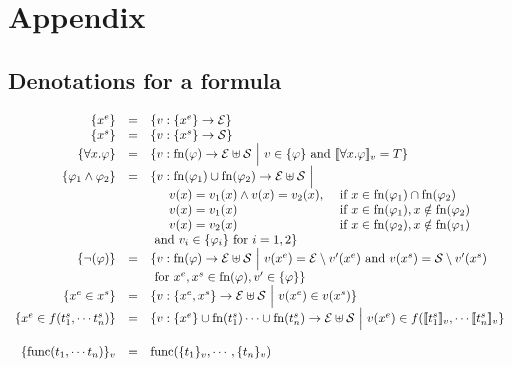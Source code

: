 \section{Appendix}

\subsection{Denotations for a formula}
\label{app:denote}
\[
\begin{array}{rcl}
  \{x^e\} &=& \{v : \{x^e\}\to \mathcal{E}\}\\
  \{x^s\} &=& \{v : \{x^s\}\to \mathcal{S}\}\\
  \{\forall x.\varphi\} &=& \{v :\mathrm{fn}(\varphi)\to\mathcal{E}\uplus\mathcal{S} ~\Big|~ v \in \{\varphi\}\text{ and }[\![\forall x.\varphi]\!]_v= T\}\\
  \{\varphi_1 \wedge \varphi_2\} &=& \{v: \mathrm{fn}(\varphi_1)\cup\mathrm{fn}(\varphi_2)\to\mathcal{E}\uplus\mathcal{S}~\Big|~ \\
  &&\begin{array}{ll}
  \quad v(x) = v_1(x)\wedge v(x) = v_2(x), &\text{ if }x\in\mathrm{fn}(\varphi_1)\cap\mathrm{fn}(\varphi_2)\\
  \quad v(x) = v_1(x) &\text{ if }x\in\mathrm{fn}(\varphi_1),x\notin\mathrm{fn}(\varphi_2)\\
  \quad v(x) = v_2(x) &\text{ if }x\in\mathrm{fn}(\varphi_2),x\notin\mathrm{fn}(\varphi_1)\\
  \end{array}\\
  &&\text{ and }v_i\in\{\varphi_i\}\text{ for }i=1,2\}\\
  \{\neg(\varphi)\} &=& \{v :\mathrm{fn}(\varphi)\to\mathcal{E}\uplus\mathcal{S} ~\Big|~ v(x^e) = \mathcal{E}\setminus v'(x^e)\text{ and }v(x^s) = \mathcal{S}\setminus v'(x^s)\\
  &&\text{ for }x^e, x^s\in \mathrm{fn}(\varphi), v'\in\{\varphi\}\}
  \\
  \{ x^e\in x^s\} &=& \{v :\{x^e,x^s\}\to\mathcal{E}\uplus\mathcal{S} ~\Big|~ v(x^e)\in v(x^s) \} \\
  \{ x^e\in f(t^s_1,\cdots t^s_n)\} &=& \{v :\{x^e\}\cup\mathrm{fn}(t^s_1)\cdots\cup\mathrm{fn}(t^s_n)\to\mathcal{E}\uplus\mathcal{S} ~\Big|~ v(x^e)\in f([\![t^s_1]\!]_v,\cdots [\![t^s_n]\!]_v \} \\
  \\
  \{\text{func}(t_1,\cdots t_n)\}_{v} &=& \text{func}(\{t_1\}_{v},\cdots,\{t_n\}_{v}) \\
\end{array}
\]

